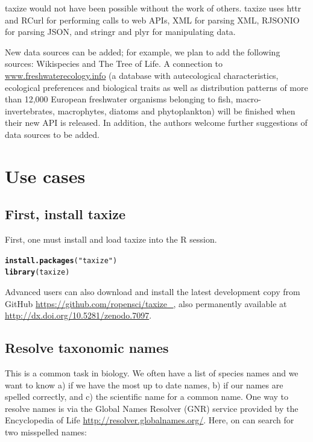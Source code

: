 \documentclass[10pt,a4paper,twocolumn]{article}\usepackage[]{graphicx}\usepackage[]{color}
\makeatletter
\newcommand{\hlstr}[1]{\textcolor[rgb]{0.192,0.494,0.8}{#1}}%
\newcommand{\hlstd}[1]{\textcolor[rgb]{0.345,0.345,0.345}{#1}}%
\newcommand{\hlkwd}[1]{\textcolor[rgb]{0.737,0.353,0.396}{\textbf{#1}}}%
\newenvironment{kframe}{%
 \def\at@end@of@kframe{}%
 \ifinner\ifhmode%
  \def\at@end@of@kframe{\end{minipage}}%
  \begin{minipage}{\columnwidth}%
 \fi\fi%
 \def\FrameCommand##1{\hskip\@totalleftmargin \hskip-\fboxsep
 \colorbox{shadecolor}{##1}\hskip-\fboxsep
     \hskip-\linewidth \hskip-\@totalleftmargin \hskip\columnwidth}%
 \MakeFramed {\advance\hsize-\width
   \@totalleftmargin\z@ \linewidth\hsize
   \@setminipage}}%
 {\par\unskip\endMakeFramed%
 \at@end@of@kframe}
\newenvironment{knitrout}{}{} %
\makeatother
\begin{document}
taxize would not have been possible without the work of others. taxize uses httr \cite{httr} and RCurl \cite{rcurl} for performing calls to web APIs, XML \cite{xml} for parsing XML, RJSONIO \cite{rjsonio} for parsing JSON, and stringr \cite{stringr} and plyr \cite{plyr} for manipulating data.
  
New data sources can be added; for example, we plan to add the following sources: Wikispecies and The Tree of Life. A connection to \url{www.freshwaterecology.info} (a database with autecological characteristics, ecological preferences and biological traits as well as distribution patterns of more than 12,000 European freshwater organisms belonging to fish, macro-invertebrates, macrophytes, diatoms and phytoplankton) will be finished when their new API is released. In addition, the authors welcome further suggestions of data sources to be added.

\section*{Use cases}

\subsection*{First, install taxize}

First, one must install and load taxize into the R session.

\begin{knitrout}\scriptsize
{}\color{fgcolor}\begin{kframe}
\begin{alltt}
\hlkwd{install.packages}\hlstd{(}\hlstr{"taxize"}\hlstd{)}
\hlkwd{library}\hlstd{(taxize)}
\end{alltt}
\end{kframe}
\end{knitrout}





Advanced users can also download and install the latest development copy from GitHub \url{https://github.com/ropensci/taxize_}, also permanently available at \url{http://dx.doi.org/10.5281/zenodo.7097}.

\subsection*{Resolve taxonomic names}

This is a common task in biology. We often have a list of species names and we want to know a) if we have the most up to date names, b) if our names are spelled correctly, and c) the scientific name for a common name. One way to resolve names is via the Global Names Resolver (GNR) service provided by the Encyclopedia of Life \url{http://resolver.globalnames.org/}. Here, on can search for two misspelled names:
\end{document}
